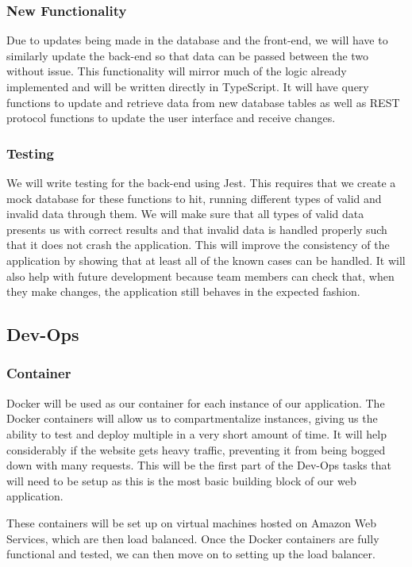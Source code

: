 \documentclass[draftclsnofoot,onecolumn,journal,letterpaper,compsoc,10pt]{IEEEtran}
\begin{document}
    \subsubsection{New Functionality}
        Due to updates being made in the database and the front-end, we will have to similarly update the back-end so that data can be passed between the two without issue. This functionality will mirror much of the logic already implemented and will be written directly in TypeScript. It will have query functions to update and retrieve data from new database tables as well as REST protocol functions to update the user interface and receive changes.
    \subsubsection{Testing}
        We will write testing for the back-end using Jest. This requires that we create a mock database for these functions to hit, running different types of valid and invalid data through them. We will make sure that all types of valid data presents us with correct results and that invalid data is handled properly such that it does not crash the application. This will improve the consistency of the application by showing that at least all of the known cases can be handled. It will also help with future development because team members can check that, when they make changes, the application still behaves in the expected fashion.
        
    \subsection{Dev-Ops}
        \subsubsection{Container}
            Docker will be used as our container for each instance of our application. The Docker containers will allow us to compartmentalize instances, giving us the ability to test and deploy multiple in a very short amount of time. It will help considerably if the website gets heavy traffic, preventing it from being bogged down with many requests. This will be the first part of the Dev-Ops tasks that will need to be setup as this is the most basic building block of our web application.
             
            These containers will be set up on virtual machines hosted on Amazon Web Services, which are then load balanced. Once the Docker containers are fully functional and tested, we can then move on to setting up the load balancer.
            
\end{document}
